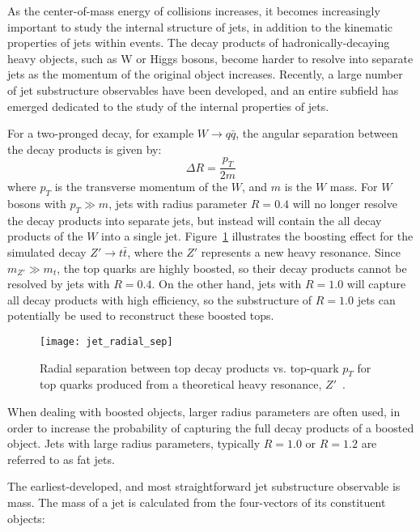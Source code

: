 As the center-of-mass energy of collisions increases, it becomes increasingly important to study the internal structure of jets, in addition to the kinematic properties of jets within events.
The decay products of hadronically-decaying heavy objects, such as W or Higgs bosons, become harder to resolve into separate jets as the momentum of the original object increases.
Recently, a large number of jet substructure observables have been developed, and an entire subfield has emerged dedicated to the study of the internal properties of jets.

For a two-pronged decay, for example $W \rightarrow q\bar{q}$, the angular separation between the decay products is given by:
\begin{equation}\label{eq:jet_boosted_sep}
    \Delta R = \frac{p_{T}}{2m}
\end{equation}
where $p_T$ is the transverse momentum of the $W$, and $m$ is the $W$ mass.
For $W$ bosons with $p_T \gg m$, jets with radius parameter $R = 0.4$ will no longer resolve the decay products into separate jets,
but instead will contain the all decay products of the $W$ into a single jet.
Figure~\ref{fig:jet_radial_sep} illustrates the boosting effect for the simulated decay $Z'\rightarrow t\bar{t}$, where the $Z'$ represents a new heavy resonance.
Since $m_{Z'} \gg m_{t}$, the top quarks are highly boosted, so their decay products cannot be resolved by jets with $R=0.4$.
On the other hand, jets with $R = 1.0$ will capture all decay products with high efficiency, so the substructure of $R=1.0$ jets can potentially be used to reconstruct these boosted tops.

\begin{figure}[!ht]
    \centering
\texttt{[image: jet\_radial\_sep]}
\caption{Radial separation between top decay products vs. top-quark $p_T$ for top quarks produced from a theoretical heavy resonance, $Z'$~\cite{jet-substructure-perf}.}
\label{fig:jet_radial_sep}
\end{figure}

When dealing with boosted objects, larger radius parameters are often used, in order to increase the probability of capturing the full decay products of a boosted object.
Jets with large radius parameters, typically $R=1.0$ or $R=1.2$ are referred to as fat jets.

The earliest-developed, and most straightforward jet substructure observable is mass.
The mass of a jet is calculated from the four-vectors of its constituent objects:

